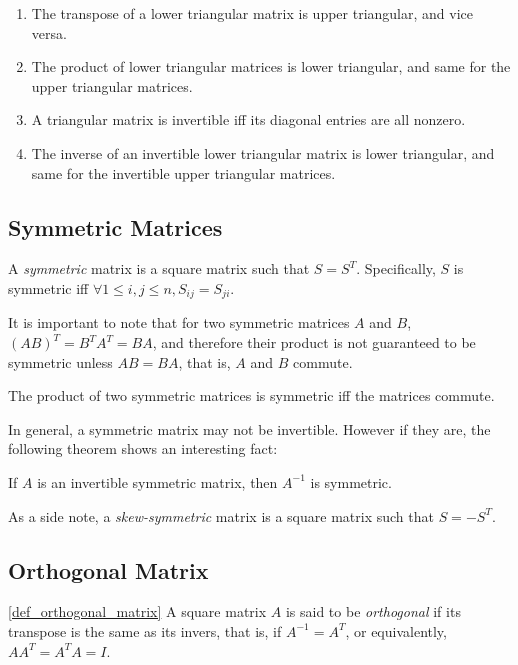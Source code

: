 \documentclass{report}
\begin{document}
		\begin{thm}
			\begin{enumerate}
				\item The transpose of a lower triangular matrix is upper triangular, and vice versa.
				\item The product of lower triangular matrices is lower triangular, and same for the upper triangular matrices.
				\item A triangular matrix is invertible iff its diagonal entries are all nonzero.
				\item The inverse of an invertible lower triangular matrix is lower triangular, and same for the invertible upper triangular matrices.
			\end{enumerate}
		\end{thm}
		
		\subsection{Symmetric Matrices}
		A \emph{symmetric} matrix is a square matrix such that $S=S^T$. Specifically, $S$ is symmetric iff $\forall 1 \le i,j \le n, S_{ij}=S_{ji}$.
		
		It is important to note that for two symmetric matrices $A$ and $B$, $(AB)^T=B^TA^T=BA$, and therefore their product is not guaranteed to be symmetric unless $AB=BA$, that is, $A$ and $B$ commute.
		
		\begin{thm}
			The product of two symmetric matrices is symmetric iff the matrices commute.
		\end{thm}
		
		In general, a symmetric matrix may not be invertible. However if they are, the following theorem shows an interesting fact:
		
		\begin{thm}
			If $A$ is an invertible symmetric matrix, then $A^{-1}$ is symmetric.
		\end{thm}
		
		As a side note, a \emph{skew-symmetric} matrix is a square matrix such that $S=-S^T$.
		
		\subsection{Orthogonal Matrix}
		\begin{defn}\ref{def_orthogonal_matrix}
			A square matrix $A$ is said to be \emph{orthogonal} if its transpose is the same as its invers, that is, if $A^{-1}=A^T$, or equivalently, $AA^T=A^TA=I$.
		\end{defn}
		
\end{document}
